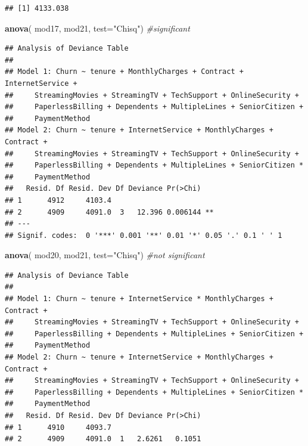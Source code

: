 \documentclass[
  twoside]{article}
\newenvironment{Shaded}{\begin{snugshade}}{\end{snugshade}}
\newcommand{\AttributeTok}[1]{\textcolor[rgb]{0.13,0.29,0.53}{#1}}
\newcommand{\CommentTok}[1]{\textcolor[rgb]{0.56,0.35,0.01}{\textit{#1}}}
\newcommand{\FunctionTok}[1]{\textcolor[rgb]{0.13,0.29,0.53}{\textbf{#1}}}
\newcommand{\NormalTok}[1]{#1}
\newcommand{\StringTok}[1]{\textcolor[rgb]{0.31,0.60,0.02}{#1}}
\begin{document}
\begin{verbatim}
## [1] 4133.038
\end{verbatim}

\begin{Shaded}
\begin{Highlighting}[]
\FunctionTok{anova}\NormalTok{( mod17, mod21,  }\AttributeTok{test=}\StringTok{"Chisq"}\NormalTok{) }\CommentTok{\#significant}
\end{Highlighting}
\end{Shaded}

\begin{verbatim}
## Analysis of Deviance Table
## 
## Model 1: Churn ~ tenure + MonthlyCharges + Contract + InternetService + 
##     StreamingMovies + StreamingTV + TechSupport + OnlineSecurity + 
##     PaperlessBilling + Dependents + MultipleLines + SeniorCitizen + 
##     PaymentMethod
## Model 2: Churn ~ tenure + InternetService + MonthlyCharges + Contract + 
##     StreamingMovies + StreamingTV + TechSupport + OnlineSecurity + 
##     PaperlessBilling + Dependents + MultipleLines + SeniorCitizen * 
##     PaymentMethod
##   Resid. Df Resid. Dev Df Deviance Pr(>Chi)   
## 1      4912     4103.4                        
## 2      4909     4091.0  3   12.396 0.006144 **
## ---
## Signif. codes:  0 '***' 0.001 '**' 0.01 '*' 0.05 '.' 0.1 ' ' 1
\end{verbatim}

\begin{Shaded}
\begin{Highlighting}[]
\FunctionTok{anova}\NormalTok{( mod20, mod21,  }\AttributeTok{test=}\StringTok{"Chisq"}\NormalTok{) }\CommentTok{\#not significant}
\end{Highlighting}
\end{Shaded}

\begin{verbatim}
## Analysis of Deviance Table
## 
## Model 1: Churn ~ tenure + InternetService * MonthlyCharges + Contract + 
##     StreamingMovies + StreamingTV + TechSupport + OnlineSecurity + 
##     PaperlessBilling + Dependents + MultipleLines + SeniorCitizen + 
##     PaymentMethod
## Model 2: Churn ~ tenure + InternetService + MonthlyCharges + Contract + 
##     StreamingMovies + StreamingTV + TechSupport + OnlineSecurity + 
##     PaperlessBilling + Dependents + MultipleLines + SeniorCitizen * 
##     PaymentMethod
##   Resid. Df Resid. Dev Df Deviance Pr(>Chi)
## 1      4910     4093.7                     
## 2      4909     4091.0  1   2.6261   0.1051
\end{verbatim}
\end{document}
